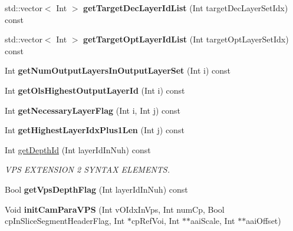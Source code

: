 \begin{DoxyCompactItemize}
std\+::vector$<$ Int $>$ {\bfseries get\+Target\+Dec\+Layer\+Id\+List} (Int target\+Dec\+Layer\+Set\+Idx) const
\item 
\mbox{\label{class_t_com_v_p_s_af27f11e4427bcf814c24295d85ad205c}} 
std\+::vector$<$ Int $>$ {\bfseries get\+Target\+Opt\+Layer\+Id\+List} (Int target\+Opt\+Layer\+Set\+Idx) const
\item 
\mbox{\label{class_t_com_v_p_s_a70bc8dafe41b741b6f9762b5f90d87c9}} 
Int {\bfseries get\+Num\+Output\+Layers\+In\+Output\+Layer\+Set} (Int i) const
\item 
\mbox{\label{class_t_com_v_p_s_ab1ec267ea23256befa4ebedc91de74f4}} 
Int {\bfseries get\+Ols\+Highest\+Output\+Layer\+Id} (Int i) const
\item 
\mbox{\label{class_t_com_v_p_s_a0bfd94bc9b603cef90eee97ef14d4664}} 
Int {\bfseries get\+Necessary\+Layer\+Flag} (Int i, Int j) const
\item 
\mbox{\label{class_t_com_v_p_s_a271aa1938548dcb9309f1c6bc7bb909b}} 
Int {\bfseries get\+Highest\+Layer\+Idx\+Plus1\+Len} (Int j) const
\item 
\mbox{\label{class_t_com_v_p_s_a1cb645870850fcccc38a5d23be4aad4f}} 
Int \hyperlink{class_t_com_v_p_s_a1cb645870850fcccc38a5d23be4aad4f}{get\+Depth\+Id} (Int layer\+Id\+In\+Nuh) const
\begin{DoxyCompactList}\small\item\em V\+PS E\+X\+T\+E\+N\+S\+I\+ON 2 S\+Y\+N\+T\+AX E\+L\+E\+M\+E\+N\+TS. \end{DoxyCompactList}\item 
\mbox{\label{class_t_com_v_p_s_a8b16d55600b791ae8cc51bf47717e763}} 
Bool {\bfseries get\+Vps\+Depth\+Flag} (Int layer\+Id\+In\+Nuh) const
\item 
\mbox{\label{class_t_com_v_p_s_a657a1f877e94e0407bbff03f1f8fa6f8}} 
Void {\bfseries init\+Cam\+Para\+V\+PS} (Int v\+O\+Idx\+In\+Vps, Int num\+Cp, Bool cp\+In\+Slice\+Segment\+Header\+Flag, Int $\ast$cp\+Ref\+Voi, Int $\ast$$\ast$aai\+Scale, Int $\ast$$\ast$aai\+Offset)
\item 

\end{DoxyCompactItemize}
